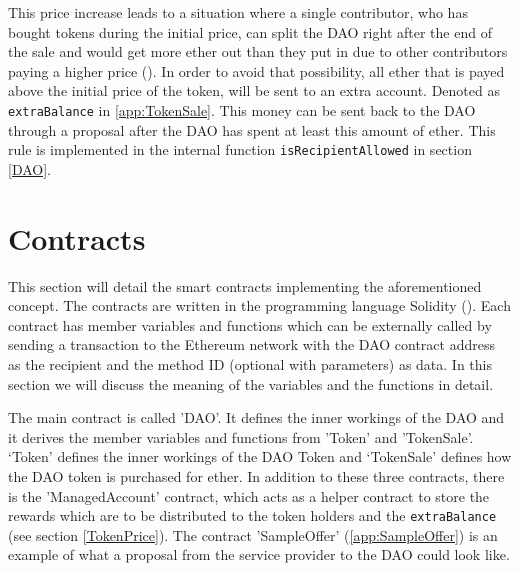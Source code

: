 \documentclass[9pt,oneside]{amsart}
\begin{document}
\begin{multicols}{2}
This price increase leads to a situation where a single contributor, who has bought tokens during the initial price, can split the DAO right after the end of the sale and would get more ether out than they put in due to other contributors paying a higher price (\cite{GriffDiscussion}).
In order to avoid that possibility, all ether that is payed above the initial price of the token, will be sent to an extra account. Denoted as \verb|extraBalance| in \ref{app:TokenSale}. This money can be sent back to the DAO through a proposal after the DAO has spent at least this amount of ether.
This rule is implemented in the internal function \verb|isRecipientAllowed| in section \ref{DAO}.

\section{Contracts}
This section will detail the smart contracts implementing the aforementioned concept. The contracts are written in the programming language Solidity (\cite{ReitwiessnerWoodSolidity}).
Each contract has member variables and functions which can be externally called by sending a transaction to the Ethereum network with the DAO contract address as the recipient and the method ID (optional with parameters) as data. In this section we will discuss the meaning of the variables and the functions in detail.

The main contract is called 'DAO'. It defines the inner workings of the DAO and it derives the member variables and functions from 'Token' and 'TokenSale'. ‘Token’ defines the inner workings of the DAO Token and ‘TokenSale’ defines how the DAO token is purchased for ether. In addition to these three contracts, there is the 'ManagedAccount' contract, which acts as a helper contract to store the rewards which are to be distributed to the token holders and the \verb|extraBalance| (see section \ref{TokenPrice}).
The contract 'SampleOffer' (\ref{app:SampleOffer}) is an example of what a proposal from the service provider to the DAO could look like.
\end{multicols}
\end{document}
